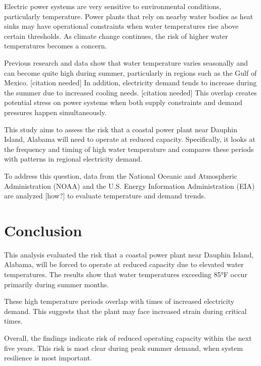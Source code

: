 \documentclass[
  letterpaper,
  DIV=11,
  numbers=noendperiod]{scrreprt}
\begin{document}
Electric power systems are very sensitive to environmental conditions,
particularly temperature. Power plants that rely on nearby water bodies
as heat sinks may have operational constraints when water temperatures
rise above certain thresholds. As climate change continues, the risk of
higher water temperatures becomes a concern.

Previous research and data show that water temperature varies seasonally
and can become quite high during summer, particularly in regions such as
the Gulf of Mexico. {[}citation needed{]} In addition, electricity
demand tends to increase during the summer due to increased cooling
needs. {[}citation needed{]} This overlap creates potential stress on
power systems when both supply constraints and demand pressures happen
simultaneously.

This study aims to assess the risk that a coastal power plant near
Dauphin Island, Alabama will need to operate at reduced capacity.
Specifically, it looks at the frequency and timing of high water
temperature and compares these periods with patterns in regional
electricity demand.

To address this question, data from the National Oceanic and Atmospheric
Administration (NOAA) and the U.S. Energy Information Administration
(EIA) are analyzed {[}how?{]} to evaluate temperature and demand trends.

\chapter{Conclusion}\label{conclusion-1}

This analysis evaluated the risk that a coastal power plant near Dauphin
Island, Alabama, will be forced to operate at reduced capacity due to
elevated water temperatures. The results show that water temperatures
exceeding 85°F occur primarily during summer months.

These high temperature periods overlap with times of increased
electricity demand. This suggests that the plant may face increased
strain during critical times.

Overall, the findings indicate risk of reduced operating capacity within
the next five years. This risk is most clear during peak summer demand,
when system resilience is most important.
\end{document}
